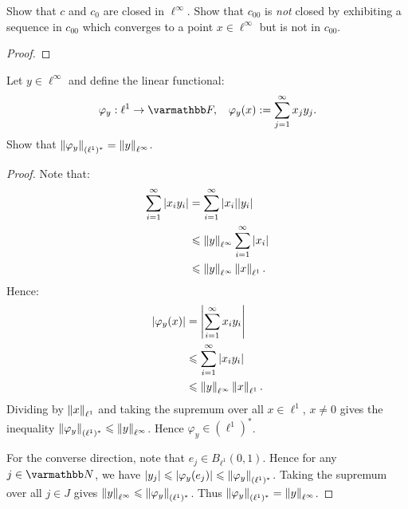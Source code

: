 \begin{exercise}
Show that $c$ and $c_0$ are closed in $\ell^\infty$. Show that $c_{00}$ is \textit{not} closed by exhibiting a sequence in $c_{00}$ which converges to a point $x \in \ell^\infty$ but is not in $c_{00}$.
\end{exercise}
    {\color{red} \begin{proof}
        
    \end{proof}}

\begin{exercise}
Let $y \in \ell^\infty$ and define the linear functional:
    \begin{equation*}
    \begin{split}
        \varphi_y:\ell^1 \rightarrow \bfF, \h9 \varphi_y(x) := \sum_{j = 1}^\infty x_j y_j.
    \end{split}
    \end{equation*}
Show that $\left\lVert \varphi_y \right\rVert_{(\ell^1)^\ast} = \left\lVert y \right\rVert_{\ell^\infty}$.
\end{exercise}
    \begin{proof}
        Note that:
        \begin{equation*}
        \begin{split}
            \sum_{i = 1}^\infty |x_i y_i|
            & = \sum_{i = 1}^\infty |x_i|| y_i| \\
            & \leqslant \left\lVert y \right\rVert_{\ell^\infty}\sum_{i = 1}^\infty |x_i| \\
            & \leqslant \left\lVert y \right\rVert_{\ell^\infty}\left\lVert x \right\rVert_{\ell^1}.
        \end{split}
        \end{equation*}
    Hence:
        \begin{equation*}
        \begin{split}
            |\varphi_y(x)| 
            & = \left|\sum_{i = 1}^\infty x_i y_i  \right| \\
            & \leqslant \sum_{i = 1}^\infty |x_i y_i| \\
            & \leqslant \left\lVert y \right\rVert_{\ell^\infty}\left\lVert x \right\rVert_{\ell^1}.
        \end{split}
        \end{equation*}
    Dividing by $\left\lVert x \right\rVert_{\ell^1}$ and taking the supremum over all $x \in \ell^1$, $x \neq 0$ gives the inequality $\left\lVert \varphi_y \right\rVert_{(\ell^1)^\ast} \leqslant \left\lVert y \right\rVert_{\ell^\infty}$. Hence $\varphi_y \in (\ell^1)^\ast$.

    For the converse direction, note that $e_j \in B_{\ell^1}(0,1)$. Hence for any $j \in \bfN$, we have $|y_j| \leqslant |\varphi_y(e_j)| \leqslant \left\lVert \varphi_y \right\rVert_{(\ell^1)^\ast}$. Taking the supremum over all $j \in J$ gives $\left\lVert y \right\rVert_{\ell^\infty} \leqslant \left\lVert \varphi_y \right\rVert_{(\ell^1)^\ast}$. Thus $\left\lVert \varphi_y \right\rVert_{(\ell^1)^\ast} = \left\lVert y \right\rVert_{\ell^\infty}$.
    \end{proof}



